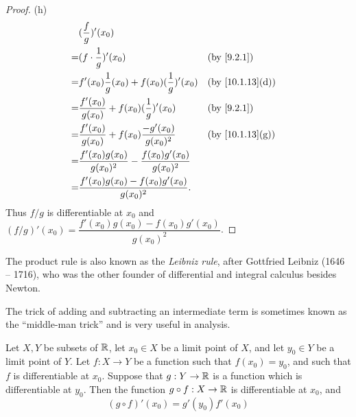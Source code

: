 \begin{proof}{(h)}
  \begin{align*}
      & (\dfrac{f}{g})'(x_0)                                                                                   \\
    = & (f \cdot \dfrac{1}{g})'(x_0)                                        &  & \by{9.2.1}                    \\
    = & f'(x_0) \dfrac{1}{g}(x_0) + f(x_0) (\dfrac{1}{g})'(x_0)             &  & \text{(by \cref{10.1.13}(d))} \\
    = & \dfrac{f'(x_0)}{g(x_0)} + f(x_0) (\dfrac{1}{g})'(x_0)               &  & \by{9.2.1}                    \\
    = & \dfrac{f'(x_0)}{g(x_0)} + f(x_0) \dfrac{-g'(x_0)}{g(x_0)^2}         &  & \text{(by \cref{10.1.13}(g))} \\
    = & \dfrac{f'(x_0) g(x_0)}{g(x_0)^2} - \dfrac{f(x_0) g'(x_0)}{g(x_0)^2}                                    \\
    = & \dfrac{f'(x_0) g(x_0) - f(x_0) g'(x_0)}{g(x_0)^2}.                                                     \\
  \end{align*}
  Thus \(f / g\) is differentiable at \(x_0\) and \((f / g)'(x_0) = \dfrac{f'(x_0) g(x_0) - f(x_0) g'(x_0)}{g(x_0)^2}\).
\end{proof}

\begin{rmk}\label{10.1.14}
  The product rule is also known as the \emph{Leibniz rule}, after Gottfried Leibniz (1646 -- 1716), who was the other founder of differential and integral calculus besides Newton.
\end{rmk}

\begin{note}
  The trick of adding and subtracting an intermediate term is sometimes known as the ``middle-man trick'' and is very useful in analysis.
\end{note}

\begin{thm}\label{10.1.15}
  Let \(X, Y\) be subsets of \(\mathbb{R}\), let \(x_0 \in X\) be a limit point of \(X\), and let \(y_0 \in Y\) be a limit point of \(Y\).
  Let \(f : X \to Y\) be a function such that \(f(x_0) = y_0\), and such that \(f\) is differentiable at \(x_0\).
  Suppose that \(g : Y \to \mathbb{R}\) is a function which is differentiable at \(y_0\).
  Then the function \(g \circ f : X \to \mathbb{R}\) is differentiable at \(x_0\), and
  \[
    (g \circ f)'(x_0) = g'(y_0) f'(x_0)
  \]
\end{thm}

